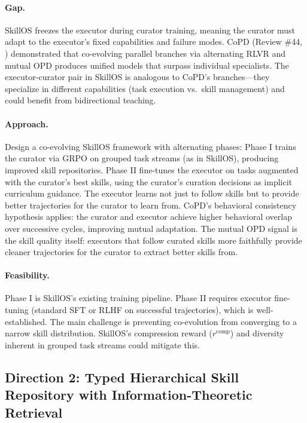 \documentclass[11pt]{article}
\begin{document}
\paragraph{Gap.}
SkillOS freezes the executor during curator training, meaning the curator must adapt to the executor's fixed capabilities and failure modes. CoPD (Review \#44, \cite{copd}) demonstrated that co-evolving parallel branches via alternating RLVR and mutual OPD produces unified models that surpass individual specialists. The executor-curator pair in SkillOS is analogous to CoPD's branches---they specialize in different capabilities (task execution vs.\ skill management) and could benefit from bidirectional teaching.

\paragraph{Approach.}
Design a co-evolving SkillOS framework with alternating phases: Phase I trains the curator via GRPO on grouped task streams (as in SkillOS), producing improved skill repositories. Phase II fine-tunes the executor on tasks augmented with the curator's best skills, using the curator's curation decisions as implicit curriculum guidance. The executor learns not just to follow skills but to provide better trajectories for the curator to learn from. CoPD's behavioral consistency hypothesis applies: the curator and executor achieve higher behavioral overlap over successive cycles, improving mutual adaptation. The mutual OPD signal is the skill quality itself: executors that follow curated skills more faithfully provide cleaner trajectories for the curator to extract better skills from.

\paragraph{Feasibility.}
Phase I is SkillOS's existing training pipeline. Phase II requires executor fine-tuning (standard SFT or RLHF on successful trajectories), which is well-established. The main challenge is preventing co-evolution from converging to a narrow skill distribution. SkillOS's compression reward ($r^{\mathrm{comp}}$) and diversity inherent in grouped task streams could mitigate this.

\subsection{Direction 2: Typed Hierarchical Skill Repository with Information-Theoretic Retrieval}
\end{document}
